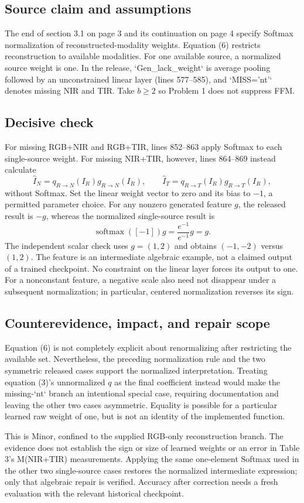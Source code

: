 \documentclass[10pt]{article}
\begin{document}
\subsection*{Source claim and assumptions}
The end of section 3.1 on page 3 and its continuation on page 4 specify Softmax normalization of reconstructed-modality weights. Equation (6) restricts reconstruction to available modalities. For one available source, a normalized source weight is one. In the release, `Gen\_lack\_weight` is average pooling followed by an unconstrained linear layer (lines 577–585), and `MISS=’nt’` denotes missing NIR and TIR. Take \(b\geq2\) so Problem 1 does not suppress FFM.\par
\subsection*{Decisive check}
For missing RGB+NIR and RGB+TIR, lines 852–863 apply Softmax to each single-source weight. For missing NIR+TIR, however, lines 864–869 instead calculate \[\widehat I_N=q_{R\to N}(I_R)g_{R\to N}(I_R),\qquad
  \widehat I_T=q_{R\to T}(I_R)g_{R\to T}(I_R),\] without Softmax. Set the linear weight vector to zero and its bias to \(-1\), a permitted parameter choice. For any nonzero generated feature \(g\), the released result is \(-g\), whereas the normalized single-source result is \[\operatorname{softmax}([-1])g
   =\frac{e^{-1}}{e^{-1}}g=g.\] The independent scalar check uses \(g=(1,2)\) and obtains \((-1,-2)\) versus \((1,2)\). The feature is an intermediate algebraic example, not a claimed output of a trained checkpoint. No constraint on the linear layer forces its output to one. For a nonconstant feature, a negative scale also need not disappear under a subsequent normalization; in particular, centered normalization reverses its sign.\par
\subsection*{Counterevidence, impact, and repair scope}
Equation (6) is not completely explicit about renormalizing after restricting the available set. Nevertheless, the preceding normalization rule and the two symmetric released cases support the normalized interpretation. Treating equation (3)’s unnormalized \(q\) as the final coefficient instead would make the missing-`nt` branch an intentional special case, requiring documentation and leaving the other two cases asymmetric. Equality is possible for a particular learned raw weight of one, but is not an identity of the implemented function.\par
This is Minor, confined to the supplied RGB-only reconstruction branch. The evidence does not establish the sign or size of learned weights or an error in Table 3’s M(NIR+TIR) measurements. Applying the same one-element Softmax used in the other two single-source cases restores the normalized intermediate expression; only that algebraic repair is verified. Accuracy after correction needs a fresh evaluation with the relevant historical checkpoint.\par
\end{document}
